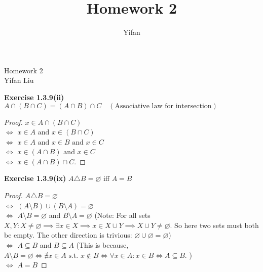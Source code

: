 \documentclass[12pt]{article}
\title{Homework 2}
\author{Yifan}
\theoremstyle{definition}
\numberwithin{equation}{subsection}
\begin{document}
\pagestyle{plain}



\begin{center}
{\large Homework 2} \\
\vspace{.2in}
Yifan Liu
\end{center}

\bigskip \bigskip


\textbf{Exercise 1.3.9(ii)} \(A \cap(B \cap C)=(A \cap B) \cap C \quad(\text {Associative law for intersection})\)
\begin{proof}
$x \in A \cap(B \cap C)$ \\$\iff$ $x \in A \text{ and } x \in (B \cap C)$ \\$\iff$ $x \in A \text{ and } x \in B \text{ and } x \in C$ \\$\iff$ $x \in (A \cap B) \text{ and } x \in C$ \\$\iff$ $x \in (A \cap B) \cap C$.
\end{proof}

\textbf{Exercise 1.3.9(ix)} \(A \triangle B=\varnothing\) iff \(A=B\)
\begin{proof}
\(A \triangle B=\varnothing\) \\$\iff$ \((A \setminus B) \cup(B \setminus A) = \varnothing\) \\$\iff$ $A \setminus B = \varnothing$ and $B \setminus A = \varnothing$ (Note: For all sets $X, Y: X \neq \varnothing \implies \exists x \in X \implies x \in X \cup Y \implies X \cup Y \neq \varnothing$. So here two sets must both be empty. The other direction is trivious: $\varnothing \cup \varnothing = \varnothing$)
\\$\iff$ \(A \subseteq B\) and \(B \subseteq A\) (This is because, $A \setminus B = \varnothing \iff \nexists x \in A \text{ s.t. } x \notin B \iff \forall x \in A: x \in B \iff A \subseteq B$. )
\\$\iff$ \(A=B\)
\end{proof}
\end{document}
